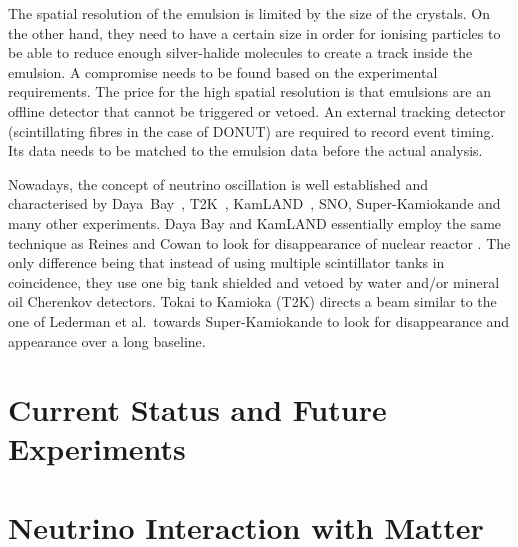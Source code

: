 The spatial resolution of the emulsion is limited by the size of the crystals.
On the other hand, they need to have a certain size in order for ionising particles to be able to reduce enough silver-halide molecules to create a track inside the emulsion.
A compromise needs to be found based on the experimental requirements.
The price for the high spatial resolution is that emulsions are an offline detector that cannot be triggered or vetoed.
An external tracking detector (scintillating fibres in the case of DONUT) are required to record event timing.
Its data needs to be matched to the emulsion data before the actual analysis.

Nowadays, the concept of neutrino oscillation is well established and characterised by Daya~Bay~\cite{dayabayRecent}, T2K~\cite{t2kOsc}, KamLAND~\cite{kamland}, SNO, Super-Kamiokande and many other experiments.
Daya Bay and KamLAND essentially employ the same technique as Reines and Cowan to look for disappearance of nuclear reactor \nueb{}.
The only difference being that instead of using multiple scintillator tanks in coincidence, they use one big tank shielded and vetoed by water and/or mineral oil Cherenkov detectors.
Tokai to Kamioka (T2K) directs a \numu{} beam similar to the one of Lederman et al.\ towards Super-Kamiokande to look for \numu{} disappearance and \nue{} appearance over a long baseline.


\section{Current Status and Future Experiments}
\label{sec:nu-detection_future-exp}



\section{Neutrino Interaction with Matter}
\label{sec:nu-detection_interactions}


